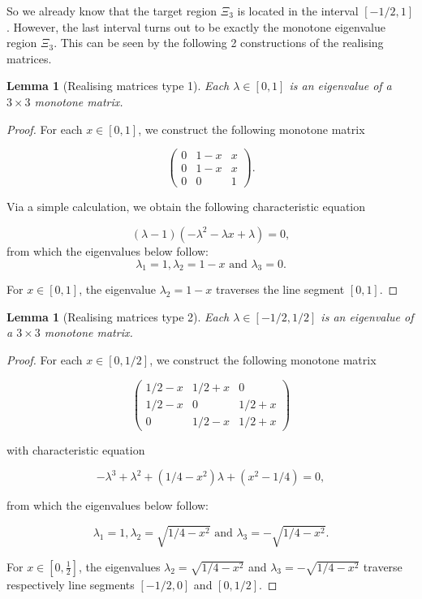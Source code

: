 \documentclass[11pt,a4paper]{article}
\newtheorem{lemma}[theorem]{Lemma}
\theoremstyle{definition}
\theoremstyle{remark}
\begin{document}
So we already know that the target region \(\Xi_3\) is located in the interval \([-1/2, 1]\). However, the last interval turns out to be exactly the monotone eigenvalue region \(\Xi_3 \). This can be seen by the following 2 constructions of the realising matrices.

\begin{lemma}[Realising matrices type 1]\label{lemmaconstructie1}
    Each \(\lambda \in [0,1]\) is an eigenvalue of a \(3 \times 3\) monotone matrix.
\end{lemma}
\begin{proof}
    For each \( x \in [0,1]\), we construct the following monotone matrix

\[\begin{pmatrix}
    0 & 1-x & x \\
    0 & 1-x & x \\
    0 & 0 & 1
\end{pmatrix} .\]

Via a simple calculation, we obtain the following characteristic equation

\[(\lambda - 1)(-\lambda^2 - \lambda x + \lambda) = 0,\]
from which the eigenvalues below follow:
\[ \lambda_1 = 1, \lambda_2 = 1-x \text{ and } \lambda_3 = 0  .\]

For \( x \in [0,1] \), the eigenvalue \( \lambda_2 = 1 - x \) traverses the line segment \([0,1]\).
\end{proof}

\begin{lemma}[Realising matrices type 2]\label{lemmaconstructie2}
    Each \(\lambda \in [-1/2,1/2]\) is an eigenvalue of a \(3 \times 3\) monotone matrix.
\end{lemma}
\begin{proof}
    For each \( x \in [0, 1/2]\), we construct the following monotone matrix

\[ \begin{pmatrix}
    1/2 - x & 1/2 + x & 0 \\
    1/2 - x & 0 & 1/2 + x \\
    0 & 1/2 - x & 1/2 +x
\end{pmatrix}\]

with characteristic equation

\[-\lambda^3 + \lambda^2 + (1/4 - x^2) \lambda + (x^2 - 1/4) = 0,\]

from which the eigenvalues below follow:

\[ \lambda_1 = 1,  \lambda_2 = \sqrt{1/4 - x^2} \text{ and } \lambda_3 = - \sqrt{1/4 - x^2}  .\]

For \( x \in [0,\frac{1}{2}] \), the eigenvalues \(\lambda_2 = \sqrt{1/4 - x^2}\) and \(\lambda_3 = - \sqrt{1/4 - x^2} \) traverse respectively line segments \([-1/2,0]\) and \([0, 1/2]\).
\end{proof}
\end{document}
